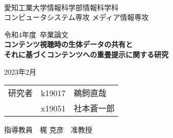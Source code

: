 \begin{titlepage}

\ \\
\begin{center}

{\LARGE 愛知工業大学情報科学部情報科学科\\
コンピュータシステム専攻 メディア情報専攻

\vspace{1.0cm}

令和4年度~卒業論文\\

\vspace{2.0cm}
{\Huge 
\baselineskip=15mm
\textbf{コンテンツ視聴時の生体データの共有と\\それに基づくコンテンツへの重畳提示に関する研究\\}}

\vspace{7.0cm}

2023年2月\\

\vspace{1.0cm}

\begin{tabular}[h]{lll}
  研究者  & k19017 & 鵜飼直哉\\
         & x19051 & 社本蒼一郎\\
\end{tabular}

\vspace{1.0cm}

指導教員\ \ 梶 克彦\ \ 准教授}

\end{center}

\end{titlepage}
    